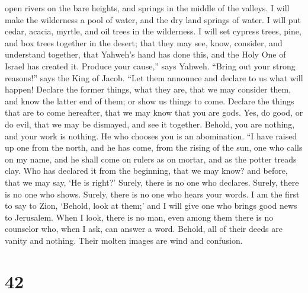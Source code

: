 open rivers on the bare heights, and springs in the middle of the
valleys. I will make the wilderness a pool of water, and the dry land
springs of water.  I will put cedar, acacia, myrtle, and
oil trees in the wilderness. I will set cypress trees, pine, and box
trees together in the desert;  that they may see, know,
consider, and understand together, that Yahweh's hand has done this, and
the Holy One of Israel has created it.  Produce your
cause,'' says Yahweh. ``Bring out your strong reasons!'' says the King
of Jacob.  ``Let them announce and declare to us what will
happen! Declare the former things, what they are, that we may consider
them, and know the latter end of them; or show us things to come.
 Declare the things that are to come hereafter, that we may
know that you are gods. Yes, do good, or do evil, that we may be
dismayed, and see it together.  Behold, you are nothing,
and your work is nothing. He who chooses you is an abomination.
 ``I have raised up one from the north, and he has come,
from the rising of the sun, one who calls on my name, and he shall come
on rulers as on mortar, and as the potter treads clay.  Who
has declared it from the beginning, that we may know? and before, that
we may say, `He is right?' Surely, there is no one who declares. Surely,
there is no one who shows. Surely, there is no one who hears your words.
 I am the first to say to Zion, `Behold, look at them;' and
I will give one who brings good news to Jerusalem.  When I
look, there is no man, even among them there is no counselor who, when I
ask, can answer a word.  Behold, all of their deeds are
vanity and nothing. Their molten images are wind and confusion.

\hypertarget{section-40}{%
\section{42}\label{section-40}}

